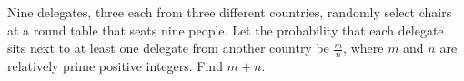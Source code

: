 Nine delegates, three each from three different countries, randomly select chairs at a round table that seats nine people. Let the probability that each delegate sits next to at least one delegate from another country be $\frac{m}{n}$, where $m$ and $n$ are relatively prime positive integers. Find $m+n$.